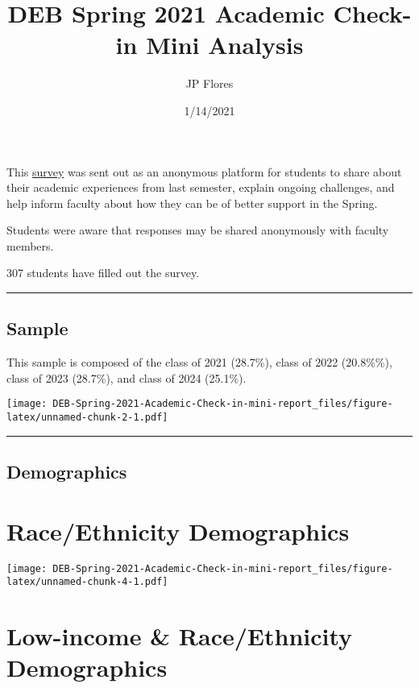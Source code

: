 \documentclass[
]{article}
\title{DEB Spring 2021 Academic Check-in Mini Analysis}
\author{JP Flores}
\date{1/14/2021}
\begin{document}
\maketitle

This
\href{https://docs.google.com/forms/d/1xsSR3A1MVAz2Ny47aP2rLM1xWB4bqMNMBovbOiUMHxA/edit}{survey}
was sent out as an anonymous platform for students to share about their
academic experiences from last semester, explain ongoing challenges, and
help inform faculty about how they can be of better support in the
Spring.

Students were aware that responses may be shared anonymously with
faculty members.

307 students have filled out the survey.

\begin{center}\rule{0.5\linewidth}{0.5pt}\end{center}

\hypertarget{sample}{%
\subsection{Sample}\label{sample}}

This sample is composed of the class of 2021 (28.7\%), class of 2022
(20.8\%\%), class of 2023 (28.7\%), and class of 2024 (25.1\%).

\texttt{[image: DEB-Spring-2021-Academic-Check-in-mini-report\_files/figure-latex/unnamed-chunk-2-1.pdf]}

\begin{center}\rule{0.5\linewidth}{0.5pt}\end{center}

\hypertarget{demographics}{%
\subsection{Demographics}\label{demographics}}

\hypertarget{raceethnicity-demographics}{%
\section{Race/Ethnicity Demographics}\label{raceethnicity-demographics}}

\texttt{[image: DEB-Spring-2021-Academic-Check-in-mini-report\_files/figure-latex/unnamed-chunk-4-1.pdf]}

\hypertarget{low-income-raceethnicity-demographics}{%
\section{Low-income \& Race/Ethnicity
Demographics}\label{low-income-raceethnicity-demographics}}
\end{document}
